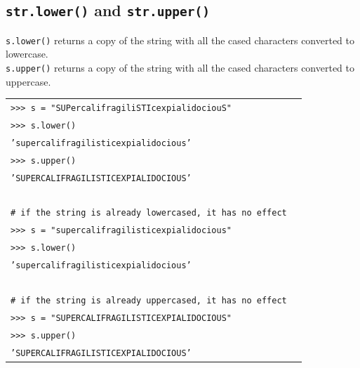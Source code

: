 \documentclass[t,handout,9pt]{beamer}
\begin{document}
\subsection{\texttt{str.lower()} and \texttt{str.upper()}}
\begin{frame}
\texttt{s.lower()} returns a copy of the string with all the cased characters converted to lowercase.\\
\texttt{s.upper()} returns a copy of the string with all the cased characters converted to uppercase.
\vfill
\begin{table}[]
\begin{flushleft}
\begin{tabular}{ll}
\texttt{>{}>{}> s = "SUPercalifragiliSTIcexpialidociouS"} &  \\
\texttt{>{}>{}> s.lower()} &  \\
\texttt{'supercalifragilisticexpialidocious'} &  \\
\texttt{>{}>{}> s.upper()} &  \\
\texttt{'SUPERCALIFRAGILISTICEXPIALIDOCIOUS'} &  \\
\texttt{ } &  \\
\texttt{\# if the string is already lowercased, it has no effect} &  \\
\texttt{>{}>{}> s = "supercalifragilisticexpialidocious"} &  \\
\texttt{>{}>{}> s.lower()} &  \\
\texttt{'supercalifragilisticexpialidocious'} &  \\
\texttt{ } &  \\
\texttt{\# if the string is already uppercased, it has no effect} &  \\
\texttt{>{}>{}> s = "SUPERCALIFRAGILISTICEXPIALIDOCIOUS"} &  \\
\texttt{>{}>{}> s.upper()} &  \\
\texttt{'SUPERCALIFRAGILISTICEXPIALIDOCIOUS'} &  \\
\end{tabular}
\end{flushleft}
\end{table}
\vfill
\end{frame}
%
\end{document}
